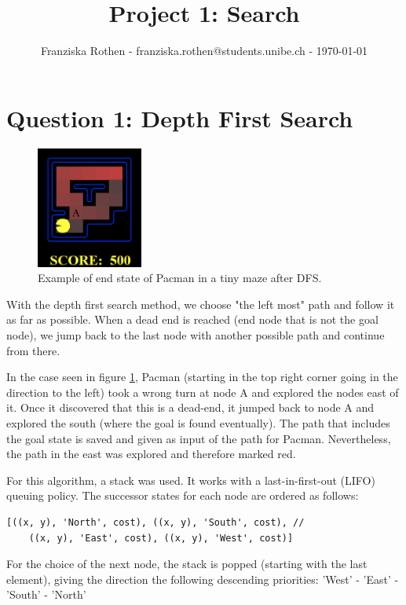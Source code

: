 \documentclass[onecolumn]{article}
\begin{document}
	
	\title{Project 1: Search}
	
	\author{Franziska Rothen - franziska.rothen@students.unibe.ch - \today}
	
	\maketitle\thispagestyle{empty}
	
	\section{Question 1: Depth First Search}
	
	\begin{figure}
		\includegraphics[width=3.5cm]{p1_1.PNG}
		\caption{Example of end state of Pacman in a tiny maze after DFS.}
		\label{fig:p1}
	\end{figure} 

	With the depth first search method, we choose "the left most" path and follow it as far as possible. When a dead end is reached (end node that is not the goal node), we jump back to the last node with another possible path and continue from there. \newline
	
	In the case seen in figure \ref{fig:p1}, Pacman (starting in the top right corner going in the direction to the left) took a wrong turn at node A and explored the nodes east of it. Once it discovered that this is a dead-end, it jumped back to node A and explored the south (where the goal is found eventually). The path that includes the goal state is saved and given as input of the path for Pacman. Nevertheless, the path in the east was explored and therefore marked red.
	
	For this algorithm, a stack was used. It works with a last-in-first-out (LIFO) queuing policy. The successor states for each node are ordered as follows: 
	\begin{lstlisting}[style=Python]
	[((x, y), 'North', cost), ((x, y), 'South', cost), //
	((x, y), 'East', cost), ((x, y), 'West', cost)]
	\end{lstlisting}
	For the choice of the next node, the stack is popped (starting with the last element), giving the direction the following descending priorities: 'West' - 'East' - 'South' - 'North' 
\end{document}

